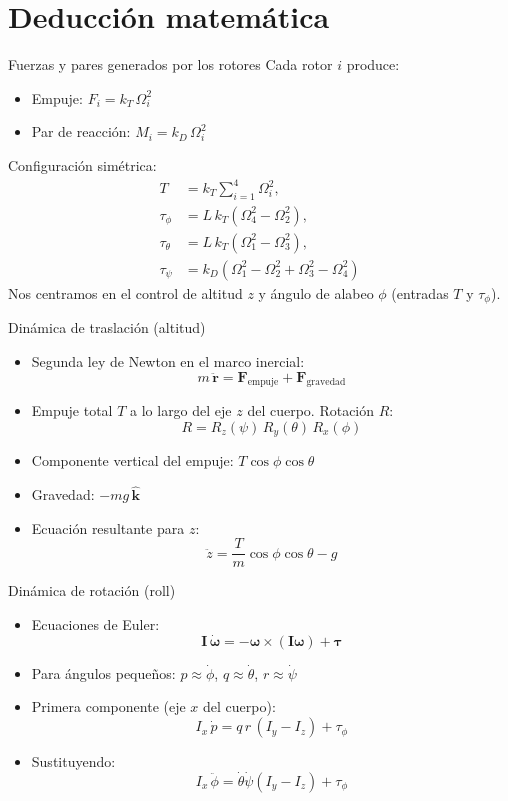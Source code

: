 \documentclass{beamer}
\begin{document}
\section{Deducción matemática}

\begin{frame}{Fuerzas y pares generados por los rotores}
Cada rotor $i$ produce:
\begin{itemize}
    \item Empuje: $F_i = k_T\,\Omega_i^2$
    \item Par de reacción: $M_i = k_D\,\Omega_i^2$
\end{itemize}
Configuración simétrica:
\begin{align}
    T      &= k_T\sum_{i=1}^4 \Omega_i^2, \\
    \tau_\phi &= L\,k_T(\Omega_4^2-\Omega_2^2), \\
    \tau_\theta &= L\,k_T(\Omega_1^2-\Omega_3^2), \\
    \tau_\psi   &= k_D(\Omega_1^2-\Omega_2^2+\Omega_3^2-\Omega_4^2)
\end{align}
Nos centramos en el control de altitud $z$ y ángulo de alabeo $\phi$ (entradas $T$ y $\tau_\phi$).
\end{frame}

\begin{frame}{Dinámica de traslación (altitud)}
\begin{itemize}
    \item Segunda ley de Newton en el marco inercial:
    \[
    m\,\ddot{\mathbf{r}} = \mathbf{F}_{\text{empuje}} + \mathbf{F}_{\text{gravedad}}
    \]
    \item Empuje total $T$ a lo largo del eje $z$ del cuerpo. Rotación $R$:
    \[
    R = R_z(\psi)\,R_y(\theta)\,R_x(\phi)
    \]
    \item Componente vertical del empuje: $T\cos\phi\cos\theta$
    \item Gravedad: $-mg\,\hat{\mathbf{k}}$
    \item Ecuación resultante para $z$:
    \[
    \boxed{\ddot{z} = \frac{T}{m}\cos\phi\cos\theta - g}
    \]
\end{itemize}
\end{frame}

\begin{frame}{Dinámica de rotación (roll)}
\begin{itemize}
    \item Ecuaciones de Euler:
    \[
    \mathbf{I}\,\dot{\boldsymbol{\omega}} = -\boldsymbol{\omega}\times(\mathbf{I}\boldsymbol{\omega}) + \boldsymbol{\tau}
    \]
    \item Para ángulos pequeños: $p\approx\dot{\phi}$, $q\approx\dot{\theta}$, $r\approx\dot{\psi}$
    \item Primera componente (eje $x$ del cuerpo):
    \[
    I_x\,\dot{p} = q\,r\,(I_y - I_z) + \tau_\phi
    \]
    \item Sustituyendo:
    \[
    \boxed{I_x\,\ddot{\phi} = \dot{\theta}\dot{\psi}(I_y - I_z) + \tau_\phi}
    \]
\end{itemize}
\end{frame}
\end{document}
